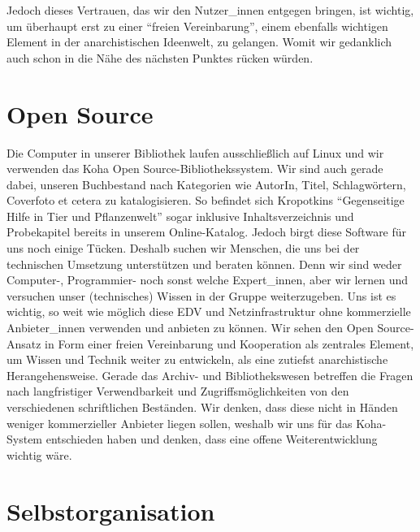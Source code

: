 \documentclass[a4paper,
fontsize=11pt,
oneside,
numbers=noperiodatend,
parskip=half-,
bibliography=totoc,
final
]{scrartcl}
\begin{document}
Jedoch dieses Vertrauen, das wir den Nutzer\_innen entgegen bringen, ist
wichtig, um überhaupt erst zu einer \enquote{freien Vereinbarung}, einem
ebenfalls wichtigen Element in der anarchistischen Ideenwelt, zu
gelangen. Womit wir gedanklich auch schon in die Nähe des nächsten
Punktes rücken würden.

\section*{Open Source}\label{open-source}

Die Computer in unserer Bibliothek laufen ausschließlich auf Linux und
wir verwenden das Koha Open Source-Bibliothekssystem. Wir sind auch
gerade dabei, unseren Buchbestand nach Kategorien wie AutorIn, Titel,
Schlagwörtern, Coverfoto et cetera zu katalogisieren. So befindet sich
Kropotkins \enquote{Gegenseitige Hilfe in Tier und Pflanzenwelt} sogar
inklusive Inhaltsverzeichnis und Probekapitel bereits in unserem
Online-Katalog. Jedoch birgt diese Software für uns noch einige Tücken.
Deshalb suchen wir Menschen, die uns bei der technischen Umsetzung
unterstützen und beraten können. Denn wir sind weder Computer-,
Programmier- noch sonst welche Expert\_innen, aber wir lernen und
versuchen unser (technisches) Wissen in der Gruppe weiterzugeben. Uns
ist es wichtig, so weit wie möglich diese EDV und Netzinfrastruktur ohne
kommerzielle Anbieter\_innen verwenden und anbieten zu können. Wir sehen
den Open Source-Ansatz in Form einer freien Vereinbarung und Kooperation
als zentrales Element, um Wissen und Technik weiter zu entwickeln, als
eine zutiefst anarchistische Herangehensweise. Gerade das Archiv- und
Bibliothekswesen betreffen die Fragen nach langfristiger Verwendbarkeit
und Zugriffsmöglichkeiten von den verschiedenen schriftlichen Beständen.
Wir denken, dass diese nicht in Händen weniger kommerzieller Anbieter
liegen sollen, weshalb wir uns für das Koha-System entschieden haben und
denken, dass eine offene Weiterentwicklung wichtig wäre.

\section*{Selbstorganisation}\label{selbstorganisation}
\end{document}
